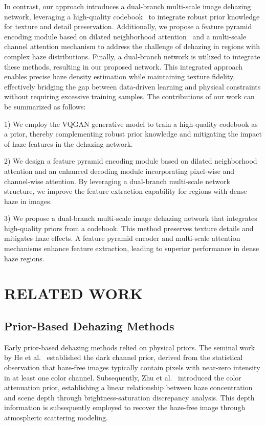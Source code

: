 \documentclass[journal]{IEEEtran}
\begin{document}
In contrast, our approach introduces a dual-branch multi-scale image dehazing network, leveraging a high-quality codebook~\cite{esser2021taming} to integrate robust prior knowledge for texture and detail preservation. Additionally, we propose a feature pyramid encoding module based on dilated neighborhood attention~\cite{hassani2022dilated} and a multi-scale channel attention mechanism to address the challenge of dehazing in regions with complex haze distributions. Finally, a dual-branch network is utilized to integrate these methods, resulting in our proposed network. This integrated approach enables precise haze density estimation while maintaining texture fidelity, effectively bridging the gap between data-driven learning and physical constraints without requiring excessive training samples. The contributions of our work can be summarized as follows:

\begin{list}{}{}
	\item{1) We employ the VQGAN generative model to train a high-quality codebook as a prior, thereby complementing robust prior knowledge and mitigating the impact of haze features in the dehazing network.}

	\item{2) We design a feature pyramid encoding module based on dilated neighborhood attention and an enhanced decoding module incorporating pixel-wise and channel-wise attention. By leveraging a dual-branch multi-scale network structure, we improve the feature extraction capability for regions with dense haze in images.}

	\item{3) We propose a dual-branch multi-scale image dehazing network that integrates high-quality priors from a codebook. This method preserves texture details and mitigates haze effects. A feature pyramid encoder and multi-scale attention mechanisms enhance feature extraction, leading to superior performance in dense haze regions.}
\end{list}

\section{RELATED WORK}
\subsection{Prior-Based Dehazing Methods}
Early prior-based dehazing methods relied on physical priors. The seminal work by He et al.~\cite{he2010single} established the dark channel prior, derived from the statistical observation that haze-free images typically contain pixels with near-zero intensity in at least one color channel. Subsequently, Zhu et al.~\cite{zhu2015fast} introduced the color attenuation prior, establishing a linear relationship between haze concentration and scene depth through brightness-saturation discrepancy analysis. This depth information is subsequently employed to recover the haze-free image through atmospheric scattering modeling.
\end{document}
